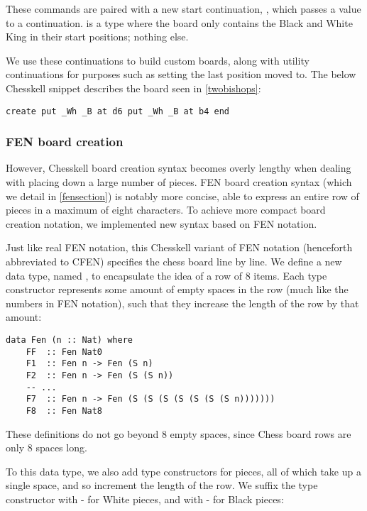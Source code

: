 These commands are paired with a new start continuation, , which passes a  value to a continuation.  is a  type where the board only contains the Black and White King in their start positions; nothing else.

We use these continuations to build custom boards, along with utility continuations for purposes such as setting the last position moved to. The below Chesskell snippet describes the board seen in \cref{twobishops}:

\begin{lstlisting}
create put _Wh _B at d6 put _Wh _B at b4 end
\end{lstlisting}

\subsubsection{FEN board creation}

However, Chesskell board creation syntax becomes overly lengthy when dealing with placing down a large number of pieces. FEN board creation syntax (which we detail in \cref{fensection}) is notably more concise, able to express an entire row of pieces in a maximum of eight characters. To achieve more compact board creation notation, we implemented new syntax based on FEN notation.

Just like real FEN notation, this Chesskell variant of FEN notation (henceforth abbreviated to CFEN) specifies the chess board line by line. We define a new data type, named , to encapsulate the idea of a row of 8 items. Each type constructor represents some amount of empty spaces in the row (much like the numbers in FEN notation), such that they increase the length of the row by that amount:

\begin{lstlisting}
data Fen (n :: Nat) where
    FF  :: Fen Nat0
    F1  :: Fen n -> Fen (S n)
    F2  :: Fen n -> Fen (S (S n))
    -- ...
    F7  :: Fen n -> Fen (S (S (S (S (S (S (S n)))))))
    F8  :: Fen Nat8
\end{lstlisting}

These definitions do not go beyond 8 empty spaces, since Chess board rows are only 8 spaces long.

To this data type, we also add type constructors for pieces, all of which take up a single space, and so increment the length of the row. We suffix the type constructor with - for White pieces, and with - for Black pieces:

